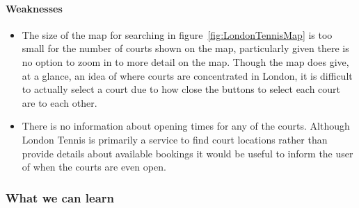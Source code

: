 \paragraph{Weaknesses}
\begin{itemize}
	\item The size of the map for searching in figure~\ref{fig:LondonTennisMap}
		is too small for the number of courts shown on the map, particularly
		given there is no option to zoom in to more detail on the map. Though
		the map does give, at a glance, an idea of where courts are
		concentrated in London, it is difficult to actually select a court due
		to how close the buttons to select each court are to each other.
	\item There is no information about opening times for any of the courts.
		Although London Tennis is primarily a service to find court locations
		rather than provide details about available bookings it would be useful
		to inform the user of when the courts are even open.
\end{itemize}

\subsubsection{What we can learn}
\label{ssub:what_we_can_learn}

